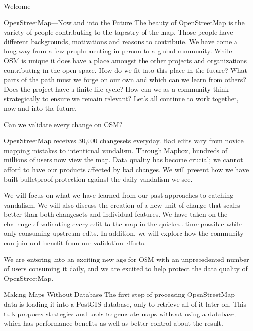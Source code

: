 \justifying
\newpage

\abstractDeDonato{}%
{Welcome}%
{}%
{}

%
{OpenStreetMap—Now and into the Future}%
{}%
{%
  The beauty of OpenStreetMap is the variety of people contributing to the tapestry of the map.
  Those people have different backgrounds, motivations and reasons to contribute. We have come a
  long way from a few people meeting in person to a global community. While OSM is unique it does
  have a place amongst the other projects and organizations contributing in the open space. How do
  we fit into this place in the future? What parts of the path must we forge on our own and which
  can we learn from others? Does the project have a finite life cycle? How can we as a community
  think strategically to ensure we remain relevant? Let’s all continue to work together, now and
  into the future.%
}

%
{Can we validate every change on OSM?}%
{}%
{%
  OpenStreetMap receives 30,000 changesets everyday. Bad edits vary from novice mapping mistakes to
  intentional vandalism. Through Mapbox, hundreds of millions of users now view the map. Data
  quality has become crucial; we cannot afford to have our products affected by bad changes. We will
  present how we have built bulletproof protection against the daily vandalism we see.

  We will focus on what we have learned from our past approaches to catching vandalism. We will also
  discuss the creation of a new unit of change that scales better than both changesets and individual
  features. We have taken on the challenge of validating every edit to the map in the quickest time
  possible while only consuming upstream edits. In addition, we will explore how the community can
  join and benefit from our validation efforts.
  
  We are entering into an exciting new age for OSM with an unprecedented number of users consuming it
  daily, and we are excited to help protect the data quality of OpenStreetMap.%
}

%
{Making Maps Without Database}%
{}%
{%
  The first step of processing OpenStreetMap data is loading it into a PostGIS database, only to
  retrieve all of it later on. This talk proposes strategies and tools to generate maps without
  using a database, which has performance benefits as well as better control about the result.%
}

